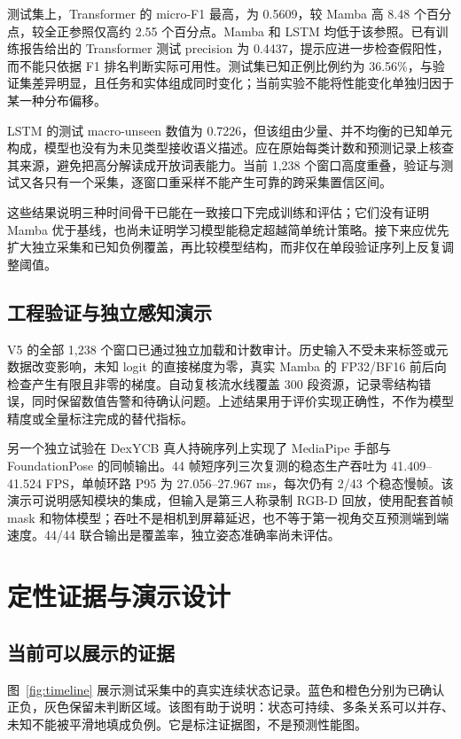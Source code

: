\documentclass[10pt,twocolumn,letterpaper]{article}
\begin{document}
测试集上，Transformer 的 micro-F1 最高，为 0.5609，较 Mamba 高 8.48 个百分点，较全正参照仅高约 2.55 个百分点。Mamba 和 LSTM 均低于该参照。已有训练报告给出的 Transformer 测试 precision 为 0.4437，提示应进一步检查假阳性，而不能只依据 F1 排名判断实际可用性。测试集已知正例比例约为 36.56\%，与验证集差异明显，且任务和实体组成同时变化；当前实验不能将性能变化单独归因于某一种分布偏移。

LSTM 的测试 macro-unseen 数值为 0.7226，但该组由少量、并不均衡的已知单元构成，模型也没有为未见类型接收语义描述。应在原始每类计数和预测记录上核查其来源，避免把高分解读成开放词表能力。当前 1,238 个窗口高度重叠，验证与测试又各只有一个采集，逐窗口重采样不能产生可靠的跨采集置信区间。

这些结果说明三种时间骨干已能在一致接口下完成训练和评估；它们没有证明 Mamba 优于基线，也尚未证明学习模型能稳定超越简单统计策略。接下来应优先扩大独立采集和已知负例覆盖，再比较模型结构，而非仅在单段验证序列上反复调整阈值。

\subsection{工程验证与独立感知演示}
V5 的全部 1,238 个窗口已通过独立加载和计数审计。历史输入不受未来标签或元数据改变影响，未知 logit 的直接梯度为零，真实 Mamba 的 FP32/BF16 前后向检查产生有限且非零的梯度。自动复核流水线覆盖 300 段资源，记录零结构错误，同时保留数值告警和待确认问题。上述结果用于评价实现正确性，不作为模型精度或全量标注完成的替代指标。

另一个独立试验在 DexYCB 真人持碗序列上实现了 MediaPipe 手部与 FoundationPose 的同帧输出。44 帧短序列三次复测的稳态生产吞吐为 41.409--41.524 FPS，单帧环路 P95 为 27.056--27.967 ms，每次仍有 2/43 个稳态慢帧。该演示可说明感知模块的集成，但输入是第三人称录制 RGB-D 回放，使用配套首帧 mask 和物体模型；吞吐不是相机到屏幕延迟，也不等于第一视角交互预测端到端速度。44/44 联合输出是覆盖率，独立姿态准确率尚未评估。

\section{定性证据与演示设计}
\subsection{当前可以展示的证据}
图~\ref{fig:timeline} 展示测试采集中的真实连续状态记录。蓝色和橙色分别为已确认正负，灰色保留未判断区域。该图有助于说明：状态可持续、多条关系可以并存、未知不能被平滑地填成负例。它是标注证据图，不是预测性能图。
\end{document}
